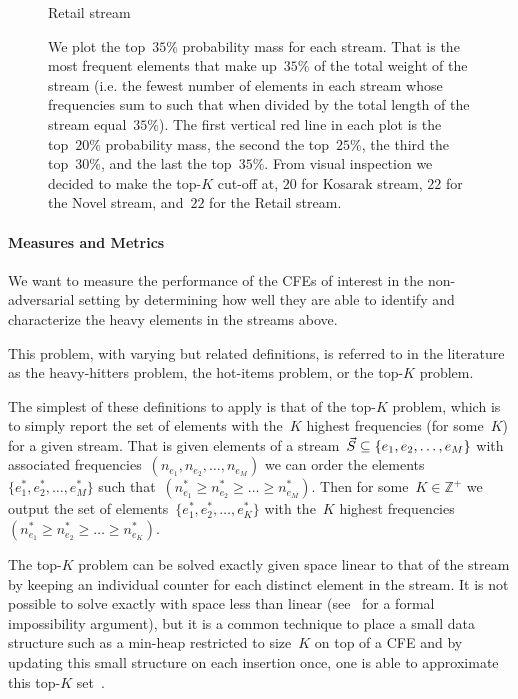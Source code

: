 \begin{figure}[!ht]
    \caption*{Retail stream}
  \endminipage
  \caption[Stream Frequent Elements.]{We plot the top~$35\%$ probability mass for each stream. That is the most frequent elements that make up~$35\%$ of the total weight of the stream (i.e. the fewest number of elements in each stream whose frequencies sum to such that when divided by the total length of the stream equal~$35\%$). The first vertical red line in each plot is the top~$20\%$ probability mass, the second the top~$25\%$, the third the top~$30\%$, and the last the top~$35\%$. From visual inspection we decided to make the top-$K$ cut-off at, $20$ for Kosarak stream, $22$ for the Novel stream, and~$22$ for the Retail stream.}
  \label{fig:stream_pm} 
\end{figure}
\paragraph{Measures and Metrics} We want to measure the performance of the CFEs of interest in the non-adversarial setting by determining how well they are able to identify and characterize the heavy elements in the streams above. %

This problem, with varying but related definitions, is referred to in the literature as the heavy-hitters problem, the hot-items problem, or the top-$K$ problem. 

The simplest of these definitions to apply is that of the top-$K$ problem, which is to simply report the set of elements with the~$K$ highest frequencies (for some~$K$) for a given stream. That is given elements of a stream~$\vec{S} \subseteq  \{ e_1,e_2,\ldots,e_M \}$ with associated frequencies~$(n_{e_1},n_{e_2},\ldots,n_{e_M})$ we can order the elements~$\{ e^{*}_{1},e^{*}_{2},\ldots,e^{*}_{M} \}$ such that~$(n^{*}_{e_1} \geq n^{*}_{e_2} \geq \ldots \geq n^{*}_{e_M})$. Then for some~$K \in \mathbb{Z}^{+}$ we output the set of elements~$\{ e^{*}_{1},e^{*}_{2},\ldots,e^{*}_{K} \}$ with the~$K$ highest frequencies~$(n^{*}_{e_1} \geq n^{*}_{e_2} \geq \ldots \geq n^{*}_{e_K})$.

The top-$K$ problem can be solved exactly given space linear to that of the stream by keeping an individual counter for each distinct element in the stream. It is not possible to solve exactly with space less than linear (see~\cite{Roughgarden_Valiant} for a formal impossibility argument), but it is a common technique to place a small data structure such as a min-heap restricted to size~$K$ on top of a CFE and by updating this small structure on each insertion once, one is able to approximate this top-$K$ set~\cite{yang2019heavykeeper,mandal2018topkapi,metwally2006}.

